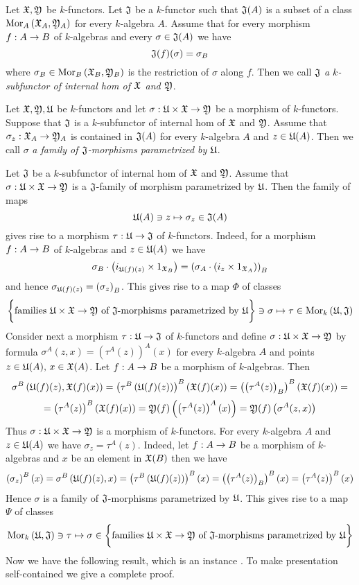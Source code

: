 \begin{definition}
Let ${\mathfrak X}, {\mathfrak Y}$ be $k$-functors. Let ${\mathfrak J}$ be a $k$-functor such that ${\mathfrak J}(A)$ is a subset of a class $\mathrm{Mor}_A\left({\mathfrak X}_A,{\mathfrak Y}_A\right)$ for every $k$-algebra $A$. Assume that for every morphism $f:A\rightarrow B$ of $k$-algebras and every $\sigma\in {\mathfrak J}(A)$ we have
$${\mathfrak J}(f)(\sigma) = \sigma_B$$
where $\sigma_B\in \mathrm{Mor}_B\left({\mathfrak X}_B,{\mathfrak Y}_B\right)$ is the restriction of $\sigma$ along $f$. Then we call ${\mathfrak J}$ \textit{a $k$-subfunctor of internal hom of ${\mathfrak X}$ and ${\mathfrak Y}$}.
\end{definition}

\begin{definition}
Let ${\mathfrak X}, {\mathfrak Y},{\mathfrak U}$ be $k$-functors and let $\sigma:{\mathfrak U}\times {\mathfrak X} \rightarrow {\mathfrak Y}$ be a morphism of $k$-functors. Suppose that ${\mathfrak J}$ is a $k$-subfunctor of internal hom of ${\mathfrak X}$ and ${\mathfrak Y}$. Assume that $\sigma_z:{\mathfrak X}_A\rightarrow {\mathfrak Y}_A$ is contained in ${\mathfrak J}(A)$ for every $k$-algebra $A$ and $z\in {\mathfrak U}(A)$. Then we call $\sigma$ \textit{a family of ${\mathfrak J}$-morphisms parametrized by ${\mathfrak U}$}.
\end{definition}
\noindent
Let ${\mathfrak J}$ be a $k$-subfunctor of internal hom of ${\mathfrak X}$ and ${\mathfrak Y}$. Assume that $\sigma:{\mathfrak U}\times {\mathfrak X}\rightarrow {\mathfrak Y}$ is a ${\mathfrak J}$-family of morphism parametrized by ${\mathfrak U}$. Then the family of maps
$${\mathfrak U}(A)\ni z\mapsto \sigma_z\in {\mathfrak J}(A)$$
gives rise to a morphism $\tau:{\mathfrak U}\rightarrow {\mathfrak J}$ of $k$-functors. Indeed, for a morphism $f:A\rightarrow B$ of $k$-algebras and $z\in {\mathfrak U}(A)$ we have
$$\sigma_B\cdot \left(i_{{\mathfrak U}(f)(z)}\times 1_{{\mathfrak X}_B}\right) = \left(\sigma_A\cdot \left(i_{z}\times 1_{{\mathfrak X}_A}\right)\right)_B$$
and hence $\sigma_{{\mathfrak U}(f)(z)} = \left(\sigma_z\right)_B$. This gives rise to a map $\Phi$ of classes
$$\bigg\{\mbox{families }{\mathfrak U}\times {\mathfrak X}\rightarrow {\mathfrak Y}\mbox{ of }{\mathfrak J}\mbox{-morphisms parametrized by }{\mathfrak U}\bigg\}\ni \sigma\mapsto \tau\in \mathrm{Mor}_k\left({\mathfrak U},{\mathfrak J}\right)$$
Consider next a morphism $\tau:{\mathfrak U}\rightarrow {\mathfrak J}$ of $k$-functors and define $\sigma:{\mathfrak U}\times {\mathfrak X}\rightarrow {\mathfrak Y}$ by formula $\sigma^A(z,x) = \left(\tau^A(z)\right)^A(x)$ for every $k$-algebra $A$ and points $z\in {\mathfrak U}(A),\,x\in {\mathfrak X}(A)$. Let $f:A\rightarrow B$ be a morphism of $k$-algebras. Then
$$\sigma^B\left({\mathfrak U}(f)(z),{\mathfrak X}(f)(x)\right) = \left(\tau^B\left({\mathfrak U}(f)(z)\right)\right)^B\left({\mathfrak X}(f)(x)\right) = \left(\left(\tau^A(z)\right)_B\right)^B\left({\mathfrak X}(f)(x)\right) =$$
$$ = \left(\tau^A(z)\right)^B\left({\mathfrak X}(f)(x)\right) = {\mathfrak Y}(f)\left(\left(\tau^A(z)\right)^A(x)\right) = {\mathfrak Y}(f)\left(\sigma^A(z,x)\right)$$
Thus $\sigma:{\mathfrak U}\times {\mathfrak X}\rightarrow {\mathfrak Y}$ is a morphism of $k$-functors. For every $k$-algebra $A$ and $z\in{\mathfrak U}(A)$ we have $\sigma_z = \tau^A(z)$. Indeed, let $f:A\rightarrow B$ be a morphism of $k$-algebras and $x$ be an element in ${\mathfrak X}(B)$ then we have
$$\left(\sigma_z\right)^B(x) = \sigma^B\left({\mathfrak U}(f)(z),x\right) = \left(\tau^B\left({\mathfrak U}(f)(z)\right)\right)^B(x) = \left(\left(\tau^A(z)\right)_B\right)^B(x) = \left(\tau^A(z)\right)^B(x)$$
Hence $\sigma$ is a family of ${\mathfrak J}$-morphisms parametrized by ${\mathfrak U}$. This gives rise to a map $\Psi$ of classes
$$\mathrm{Mor}_k\left({\mathfrak U},{\mathfrak J}\right) \ni \tau \mapsto \sigma\in \bigg\{\mbox{families }{\mathfrak U}\times {\mathfrak X}\rightarrow {\mathfrak Y}\mbox{ of }{\mathfrak J}\mbox{-morphisms parametrized by }{\mathfrak U}\bigg\}$$
Now we have the following result, which is an instance {\cite[Theorem 6.3]{Presheaves}}. To make presentation self-contained we give a complete proof.  

